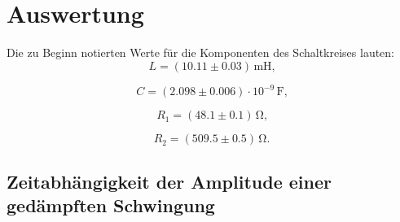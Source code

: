 \section{Auswertung}
\label{sec:Auswertung}
Die zu Beginn notierten Werte für die Komponenten des Schaltkreises lauten:
\begin{equation*}
	L=(10.11 \pm 0.03) \,\si{\milli\henry} \text{,}
\end{equation*}

\begin{equation*}
	C=(2.098 \pm 0.006) \cdot 10^{-9} \, \si{\farad} \text{,}
\end{equation*}

\begin{equation*}
	R_\text{1}= (48.1 \pm 0.1) \, \si{\ohm} \text{,}
\end{equation*}

\begin{equation*}
	R_\text{2}= (509.5\pm 0.5)\,\si{\ohm} \text{.}
\end{equation*}


\subsection{Zeitabhängigkeit der Amplitude einer gedämpften Schwingung}

